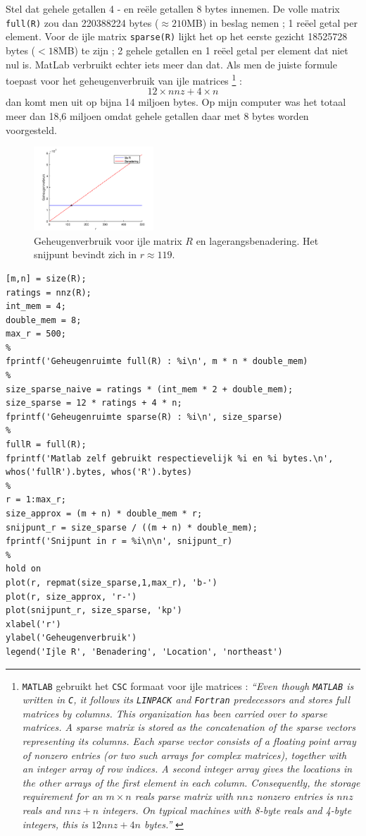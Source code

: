 Stel dat gehele getallen 4 - en re\"ele getallen 8 bytes innemen. De volle matrix \texttt{full(R)} zou dan 220388224 bytes ($\approx 210$MB) in beslag nemen ; 1 re\"eel getal per element. Voor de ijle matrix \texttt{sparse(R)} lijkt het op het eerste gezicht 18525728 bytes ($< 18$MB) te zijn ; 2 gehele getallen en 1 re\"eel getal per element dat niet nul is. MatLab verbruikt echter iets meer dan dat. Als men de juiste formule toepast voor het geheugenverbruik van ijle matrices \footnote{\texttt{MATLAB} gebruikt het \texttt{CSC} formaat voor ijle matrices : \textit{``Even though \texttt{MATLAB} is written in \texttt{C}, it follows its \texttt{LINPACK} and \texttt{Fortran} predecessors and stores full matrices by columns. This organization has been carried over to sparse matrices. A sparse matrix is stored as the concatenation of the sparse vectors representing its columns. Each sparse vector consists of a floating point array of nonzero entries (or two such arrays for complex matrices), together with an integer array of row indices. A second integer array gives the locations in the other arrays of the first element in each column. Consequently, the storage requirement for an $m\times n$ reals parse matrix with $nnz$ nonzero entries is $nnz$ reals and $nnz+n$ integers. On typical machines with 8-byte reals and 4-byte integers, this is $12nnz+4n$ bytes.''} \cite{Gilbert1992}} :
$$12\times nnz+4\times n$$
dan komt men uit op bijna 14 miljoen bytes. Op mijn computer was het totaal meer dan 18,6 miljoen omdat gehele getallen daar met 8 bytes worden voorgesteld.

\begin{figure}[h]
\centering
\includegraphics[width=0.4\textwidth]{res/op2.png}
\caption{Geheugenverbruik voor ijle matrix $R$ en lagerangsbenadering. Het snijpunt bevindt zich in $r\approx 119$.}
\label{fig:op2}
\end{figure}

\begin{lstlisting}
[m,n] = size(R);
ratings = nnz(R);
int_mem = 4;
double_mem = 8;
max_r = 500;
%
fprintf('Geheugenruimte full(R) : %i\n', m * n * double_mem)
%
size_sparse_naive = ratings * (int_mem * 2 + double_mem);
size_sparse = 12 * ratings + 4 * n;
fprintf('Geheugenruimte sparse(R) : %i\n', size_sparse)
%
fullR = full(R);
fprintf('Matlab zelf gebruikt respectievelijk %i en %i bytes.\n', whos('fullR').bytes, whos('R').bytes)
%
r = 1:max_r;
size_approx = (m + n) * double_mem * r;
snijpunt_r = size_sparse / ((m + n) * double_mem);
fprintf('Snijpunt in r = %i\n\n', snijpunt_r)
%
hold on
plot(r, repmat(size_sparse,1,max_r), 'b-')
plot(r, size_approx, 'r-')
plot(snijpunt_r, size_sparse, 'kp')
xlabel('r')
ylabel('Geheugenverbruik')
legend('Ijle R', 'Benadering', 'Location', 'northeast') 
\end{lstlisting}

